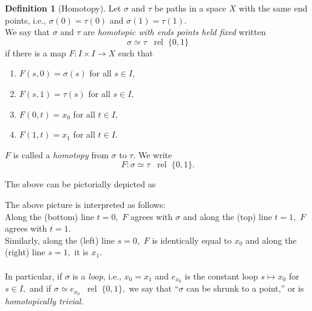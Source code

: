 \documentclass[12pt]{article}
\theoremstyle{definition}
\numberwithin{thm}{section}
\newtheorem{defn}[thm]{Definition}
\newcommand{\rel}{\;\;\operatorname{rel}\;}
\begin{document}
\begin{defn}[Homotopy]
	Let $\sigma$ and $\tau$ be paths in a space $X$ with the same end points, i.e., $\sigma(0) = \tau(0)$ and $\sigma(1) = \tau(1).$\\
	We say that $\sigma$ and $\tau$ are \emph{homotopic with ends points held fixed} written
	\begin{equation*} 
		\sigma \simeq \tau \rel \{0, 1\}
	\end{equation*}
	if there is a map $F: I \times I \to X$ such that
	\begin{enumerate}
		\item $F(s, 0) = \sigma(s)$ for all $s \in I,$
		\item $F(s, 1) = \tau(s)$ for all $s \in I,$
		\item $F(0, t) = x_0$ for all $t \in I,$
		\item $F(1, t) = x_1$ for all $t \in I.$
	\end{enumerate}
	$F$ is called a \emph{homotopy} from $\sigma$ to $\tau.$ We write
	\begin{equation*} 
		F : \sigma \simeq \tau \rel \{0, 1\}.
	\end{equation*}
\end{defn}
The above can be pictorially depicted as

\begin{center}
\end{center}

The above picture is interpreted as follows: \\
Along the (bottom) line $t = 0,$ $F$ agrees with $\sigma$ and along the (top) line $t = 1,$ $F$ agrees with $t = 1.$\\
Similarly, along the (left) line $s = 0,$ $F$ is identically equal to $x_0$ and along the (right) line $s = 1,$ it is $x_1.$\\~\\
%
In particular, if $\sigma$ is a \emph{loop}, i.e., $x_0 = x_1$ and $e_{x_0}$ is the constant loop $s \mapsto x_0$ for $s \in I,$ and if $\sigma \simeq e_{x_0} \rel \{0, 1\},$ we say that ``$\sigma$ can be shrunk to a point,'' or is \emph{homotopically trivial}.
\end{document}
